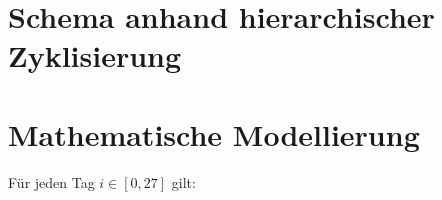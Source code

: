 \section{Schema anhand hierarchischer Zyklisierung}
\label{anhang:modellierung:gross}
\newpage
\section{Mathematische Modellierung}
\label{anhang:modell}
Für jeden Tag $i \in [0, 27]$ gilt:

